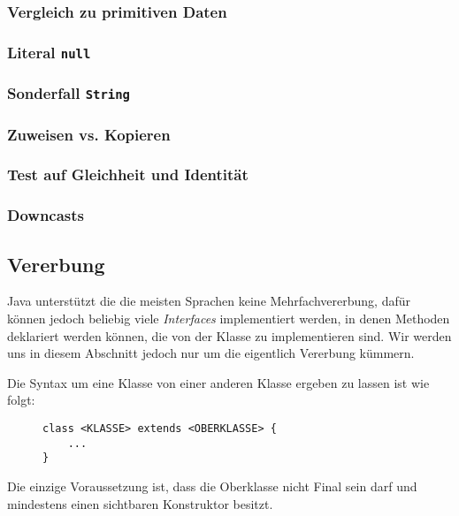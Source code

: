 	\subsubsection{Vergleich zu primitiven Daten}
	
	\subsubsection{Literal \texttt{null}}
	
	\subsubsection{Sonderfall \texttt{String}}
	
	\subsubsection{Zuweisen vs. Kopieren}
	
	\subsubsection{Test auf Gleichheit und Identität}
		\label{sec:equals_identity}
	
	
	\subsubsection{Downcasts}

\subsection{Vererbung}

	Java unterstützt die die meisten Sprachen keine Mehrfachvererbung, dafür können jedoch beliebig viele \textit{Interfaces} implementiert werden, in denen Methoden deklariert werden können, die von der Klasse zu implementieren sind. Wir werden uns in diesem Abschnitt jedoch nur um die eigentlich Vererbung kümmern.
	
	Die Syntax um eine Klasse von einer anderen Klasse ergeben zu lassen ist wie folgt:
	\begin{figure}[H]
		\centering
		\begin{lstlisting}
class <KLASSE> extends <OBERKLASSE> {
	...
}
\end{lstlisting}
	\end{figure}
	Die einzige Voraussetzung ist, dass die Oberklasse nicht Final sein darf und mindestens einen sichtbaren Konstruktor besitzt.
	
